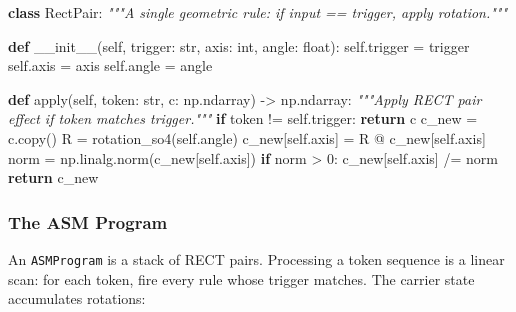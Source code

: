 \documentclass[
  twocolumn,
  10pt,
  a4paper]{article}
\newenvironment{Shaded}{}{}
\newcommand{\BuiltInTok}[1]{\textcolor[rgb]{0.00,0.50,0.00}{#1}}
\newcommand{\CommentTok}[1]{\textcolor[rgb]{0.38,0.63,0.69}{\textit{#1}}}
\newcommand{\ControlFlowTok}[1]{\textcolor[rgb]{0.00,0.44,0.13}{\textbf{#1}}}
\newcommand{\DecValTok}[1]{\textcolor[rgb]{0.25,0.63,0.44}{#1}}
\newcommand{\FunctionTok}[1]{\textcolor[rgb]{0.02,0.16,0.49}{#1}}
\newcommand{\KeywordTok}[1]{\textcolor[rgb]{0.00,0.44,0.13}{\textbf{#1}}}
\newcommand{\NormalTok}[1]{#1}
\newcommand{\OperatorTok}[1]{\textcolor[rgb]{0.40,0.40,0.40}{#1}}
\newcommand{\VariableTok}[1]{\textcolor[rgb]{0.10,0.09,0.49}{#1}}
\begin{document}
\begin{Shaded}
\begin{Highlighting}[]
\KeywordTok{class}\NormalTok{ RectPair:}
    \CommentTok{"""A single geometric rule: if input == trigger, apply rotation."""}

    \KeywordTok{def} \FunctionTok{\_\_init\_\_}\NormalTok{(}\VariableTok{self}\NormalTok{, trigger: }\BuiltInTok{str}\NormalTok{, axis: }\BuiltInTok{int}\NormalTok{, angle: }\BuiltInTok{float}\NormalTok{):}
        \VariableTok{self}\NormalTok{.trigger }\OperatorTok{=}\NormalTok{ trigger}
        \VariableTok{self}\NormalTok{.axis }\OperatorTok{=}\NormalTok{ axis}
        \VariableTok{self}\NormalTok{.angle }\OperatorTok{=}\NormalTok{ angle}

    \KeywordTok{def} \BuiltInTok{apply}\NormalTok{(}\VariableTok{self}\NormalTok{, token: }\BuiltInTok{str}\NormalTok{, c: np.ndarray) }\OperatorTok{{-}\textgreater{}}\NormalTok{ np.ndarray:}
        \CommentTok{"""Apply RECT pair effect if token matches trigger."""}
        \ControlFlowTok{if}\NormalTok{ token }\OperatorTok{!=} \VariableTok{self}\NormalTok{.trigger:}
            \ControlFlowTok{return}\NormalTok{ c}
\NormalTok{        c\_new }\OperatorTok{=}\NormalTok{ c.copy()}
\NormalTok{        R }\OperatorTok{=}\NormalTok{ rotation\_so4(}\VariableTok{self}\NormalTok{.angle)}
\NormalTok{        c\_new[}\VariableTok{self}\NormalTok{.axis] }\OperatorTok{=}\NormalTok{ R }\OperatorTok{@}\NormalTok{ c\_new[}\VariableTok{self}\NormalTok{.axis]}
\NormalTok{        norm }\OperatorTok{=}\NormalTok{ np.linalg.norm(c\_new[}\VariableTok{self}\NormalTok{.axis])}
        \ControlFlowTok{if}\NormalTok{ norm }\OperatorTok{\textgreater{}} \DecValTok{0}\NormalTok{:}
\NormalTok{            c\_new[}\VariableTok{self}\NormalTok{.axis] }\OperatorTok{/=}\NormalTok{ norm}
        \ControlFlowTok{return}\NormalTok{ c\_new}
\end{Highlighting}
\end{Shaded}

\hypertarget{the-asm-program}{%
\subsubsection{The ASM Program}\label{the-asm-program}}

An \texttt{ASMProgram} is a stack of RECT pairs. Processing a token
sequence is a linear scan: for each token, fire every rule whose trigger
matches. The carrier state accumulates rotations:
\end{document}
